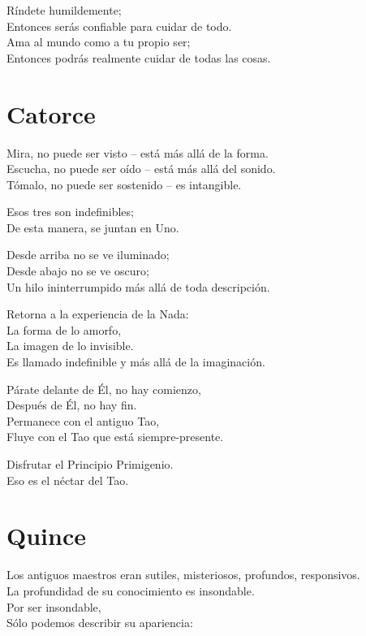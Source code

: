 \documentclass[hidelinks]{memoir}
\begin{document}
	Ríndete humildemente;\\
	Entonces serás confiable para cuidar de todo.\\
	Ama al mundo como a tu propio ser;\\
	Entonces podrás realmente cuidar de todas las cosas.
	
	\chapter*{Catorce}
	
	Mira, no puede ser visto -- está más allá de la forma.\\
	Escucha, no puede ser oído -- está más allá del sonido.\\
	Tómalo, no puede ser sostenido -- es intangible.
	
	Esos tres son indefinibles;\\
	De esta manera, se juntan en Uno.
	
	Desde arriba no se ve iluminado;\\
	Desde abajo no se ve oscuro;\\
	Un hilo ininterrumpido más allá de toda descripción.
	
	Retorna a la experiencia de la Nada:\\
	La forma de lo amorfo,\\
	La imagen de lo invisible.\\
	Es llamado indefinible y más allá de la imaginación.
	
	Párate delante de Él, no hay comienzo,\\
	Después de Él, no hay fin.\\
	Permanece con el antiguo Tao,\\
	Fluye con el Tao que está siempre-presente.
	
	Disfrutar el Principio Primigenio.\\
	Eso es el néctar del Tao.
	
	\chapter*{Quince}
	
	Los antiguos maestros eran sutiles, misteriosos, profundos,
	responsivos.\\
	La profundidad de su conocimiento es insondable.\\
	Por ser insondable,\\
	Sólo podemos describir su apariencia:
	
\end{document}

